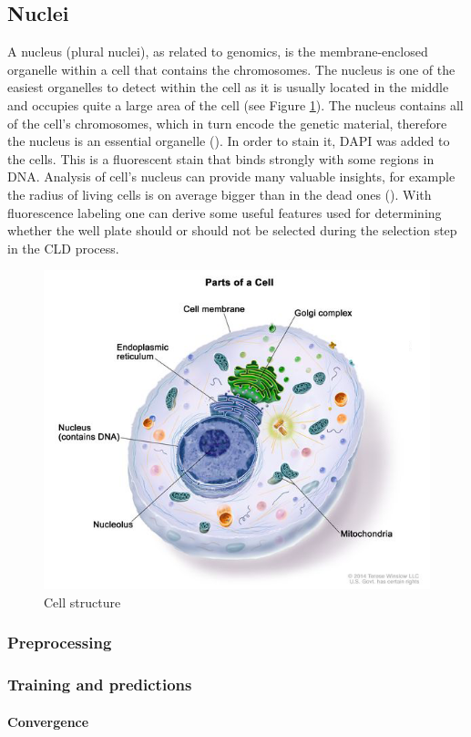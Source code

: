 \subsection{Nuclei}
    A nucleus (plural nuclei), as related to genomics, is the membrane-enclosed organelle within a cell that contains the chromosomes. The nucleus is one of the easiest organelles to detect within the cell as it is usually located in the middle and occupies quite a large area of the cell (see Figure \ref{fig:cell}). The nucleus contains all of the cell's chromosomes, which in turn encode the genetic material, therefore the nucleus is an essential organelle (\cite{genomegov}). In order to stain it, DAPI was added to the cells. This is a fluorescent stain that binds strongly with some regions in DNA. Analysis of cell's nucleus can provide many valuable insights, for example the radius of living cells is on average bigger than in the dead ones (\cite{Christiansen_2018}). With fluorescence labeling one can derive some useful features used for determining whether the well plate should or should not be selected during the selection step in the CLD process.
    \begin{figure}[htb]
        \begin{center}
            \includegraphics[width=0.3\linewidth]{bilder/cell structure.png}
            \caption{Cell structure}\label{fig:cell}
        \end{center}
    \end{figure}

    \subsubsection{Preprocessing}\label{section:nuclei-preprocessing}
        
    \subsubsection{Training and predictions}
        \paragraph{Convergence}
              
